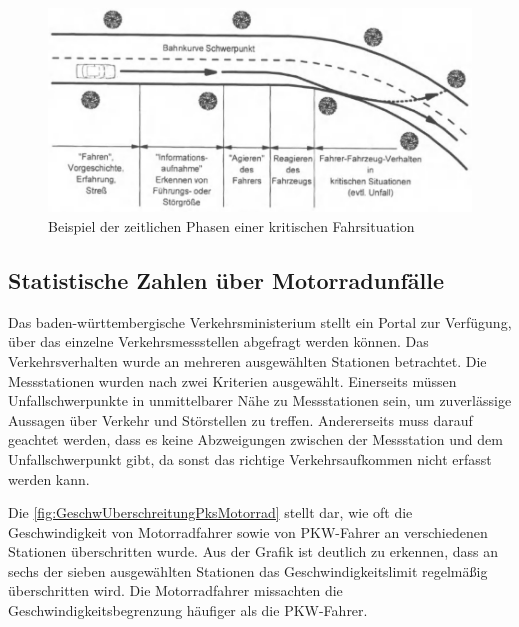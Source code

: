 \begin{figure}
	\centering
	\includegraphics[width=\linewidth]{Bilder/BeispielZeitlichePhasenEinesUnfalls.pdf}
	\caption{Beispiel der zeitlichen Phasen einer kritischen Fahrsituation \citep{Appel2002}}
	\label{fig:BeispielZeitlichePhasenEinesUnfalls}
\end{figure}

%
%
%
%
%

\subsection{Statistische Zahlen über Motorradunfälle}
Das baden-württembergische Verkehrsministerium stellt ein Portal zur Verfügung, über das einzelne Verkehrsmessstellen abgefragt werden können. Das Verkehrsverhalten wurde an mehreren ausgewählten Stationen betrachtet. Die Messstationen wurden nach zwei Kriterien ausgewählt. Einerseits müssen Unfallschwerpunkte in unmittelbarer Nähe zu Messstationen sein, um zuverlässige Aussagen über Verkehr und Störstellen zu treffen.
Andererseits muss darauf geachtet werden, dass es keine Abzweigungen zwischen der Messstation und dem Unfallschwerpunkt gibt, da sonst das richtige Verkehrsaufkommen nicht erfasst werden kann.

Die \autoref{fig:GeschwUberschreitungPksMotorrad} stellt dar, wie oft die Geschwindigkeit von Motorradfahrer sowie von PKW-Fahrer an verschiedenen Stationen überschritten wurde. Aus der Grafik ist deutlich zu erkennen, dass an sechs der sieben ausgewählten Stationen das Geschwindigkeitslimit regelmäßig überschritten wird.
Die Motorradfahrer missachten die Geschwindigkeitsbegrenzung häufiger als die PKW-Fahrer. \citep{Maire2020}



